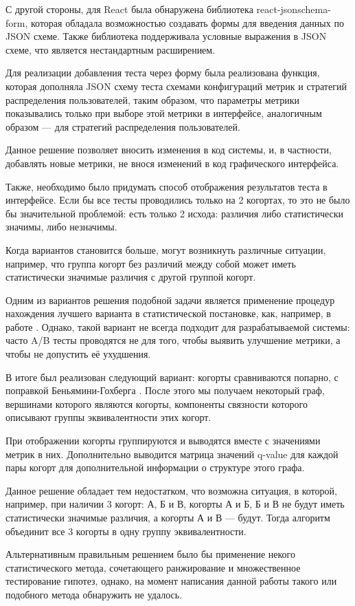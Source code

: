 \documentclass[../document.tex]{subfiles}
\begin{document}
	\par С другой стороны, для React была обнаружена библиотека react-jsonschema-form, которая обладала возможностью создавать формы для введения данных по JSON схеме. Также библиотека поддерживала условные выражения в JSON схеме, что является нестандартным расширением.
	\par Для реализации добавления теста через форму была реализована функция, которая дополняла JSON схему теста схемами конфигураций метрик и стратегий распределения пользователей, таким образом, что параметры метрики показывались только при выборе этой метрики в интерфейсе, аналогичным образом --- для стратегий распределения пользователей.
	\par Данное решение позволяет вносить изменения в код системы, и, в частности, добавлять новые метрики, не внося изменений в код графического интерфейса.
	\par Также, необходимо было придумать способ отображения результатов теста в интерфейсе. Если бы все тесты проводились только на 2 когортах, то это не было бы значительной проблемой: есть только 2 исхода: различия либо статистически значимы, либо незначимы.
	\par Когда вариантов становится больше, могут возникнуть различные ситуации, например, что группа когорт без различий между собой может иметь статистически значимые различия с другой группой когорт.
	\par Одним из вариантов решения подобной задачи является применение процедур нахождения лучшего варианта в статистической постановке, как, например, в работе \cite{sequential_choosing_best}. Однако, такой вариант не всегда подходит для разрабатываемой системы: часто A/B тесты проводятся не для того, чтобы выявить улучшение метрики, а чтобы не допустить её ухудшения.
	\par В итоге был реализован следующий вариант: когорты сравниваются попарно, с поправкой Беньямини-Гохберга \cite{benjamini_hochberg}. После этого мы получаем некоторый граф, вершинами которого являются когорты, компоненты связности которого описывают группы эквивалентности этих когорт.
	\par При отображении когорты группируются и выводятся вместе с значениями метрик в них. Дополнительно выводится матрица значений q-value для каждой пары когорт для дополнительной информации о структуре этого графа.
	\par Данное решение обладает тем недостатком, что возможна ситуация, в которой, например, при наличии 3 когорт: А, Б и В, когорты А и Б, Б и В не будут иметь статистически значимые различия, а когорты А и В --- будут. Тогда алгоритм объединит все 3 когорты в одну группу эквивалентности.
	\par Альтернативным правильным решением было бы применение некого статистического метода, сочетающего ранжирование и множественное тестирование гипотез, однако, на момент написания данной работы такого или подобного метода обнаружить не удалось.
\end{document}
